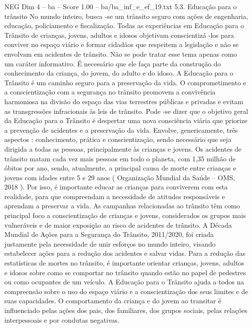 \begin{textsample}{NEG Dim 4 – ba – Score 1.00 – ba/ba\_inf\_e\_ef\_19.txt}  \label{ex:f4_neg_269}
5.3.
Educação para o trânsito No mundo inteiro, busca -se um trânsito seguro com ações de engenharia, educação, policiamento e fiscalização.
Todas as experiências em Educação para o Trânsito de crianças, jovens, adultos e idosos objetivam conscientizá -los para conviver no espaço viário e formar cidadãos que respeitem a legislação e não se envolvam em acidentes de trânsito.
Não se pode tratar esse tema apenas como um caráter informativo.
É necessário que ele faça parte da construção do conhecimento da criança, do jovem, do adulto e do idoso.
A Educação para o Trânsito é um caminho seguro para a preservação da vida.
O comprometimento e a conscientização com a segurança no trânsito promovem a convivência harmoniosa na divisão do espaço das vias terrestres públicas e privadas e evitam as transgressões infracionais às leis de trânsito.
Pode -se dizer que o objetivo geral da Educação para o Trânsito é despertar uma nova consciência viária que priorize a prevenção de acidentes e a preservação da vida.
Envolve, genericamente, três aspectos : conhecimento, prática e conscientização, sendo necessário que seja dirigida a todas as pessoas, principalmente às crianças e jovens.
Os acidentes de trânsito matam cada vez mais pessoas em todo o planeta, com 1,35 milhão de óbitos por ano, sendo, atualmente, a principal causa de morte entre crianças e jovens com idades entre 5 e 29 anos ( Organização Mundial da Saúde – OMS, 2018 ).
Por isso, é importante educar as crianças para conviverem com esta realidade, para que compreendam a necessidade de atitudes responsáveis e aprendam a preservar a vida.
As campanhas relacionadas ao trânsito têm como principal foco a conscientização de crianças e jovens, considerados os grupos mais vulneráveis e de maior exposição ao risco de acidentes de trânsito.
A Década Mundial de Ações para a Segurança do Trânsito, 2011/2020, foi criada justamente pela necessidade de unir esforços no mundo inteiro, visando estabelecer ações para a redução dos acidentes e salvar vidas.
Para a redução das estatísticas de mortes no trânsito, é importante orientar crianças, jovens, adultos e idosos sobre como se comportar no trânsito quando estão no papel de pedestres ou como ocupantes de um veículo.
A Educação para o Trânsito ajuda a todos na compreensão sobre o uso do espaço viário e a conscientização dos seus limites e de suas capacidades.
O comportamento da criança e do jovem ao transitar é influenciado pelas ações dos pais, dos familiares, dos grupos sociais, pelas relações interpessoais e por condutas negativas.

\end{textsample}
